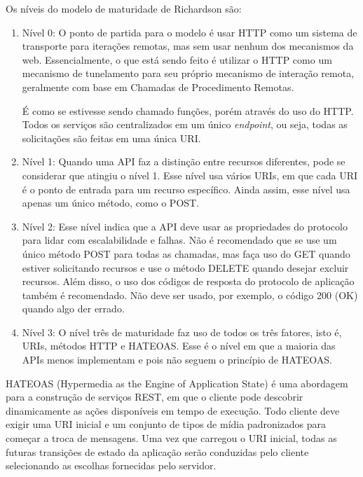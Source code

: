 Os níveis do modelo de maturidade de Richardson são:

\begin{enumerate}[label=\alph*)]

\item Nível 0: O ponto de partida para o modelo é usar HTTP como um sistema de transporte para iterações remotas, mas sem usar nenhum dos mecanismos da web. Essencialmente, o que está sendo feito é utilizar o HTTP como um mecanismo de tunelamento para seu próprio mecanismo de interação remota, geralmente com base em Chamadas de Procedimento Remotas. 

É como se estivesse sendo chamado funções, porém através do uso do HTTP. Todos os serviços são centralizados em um único \textit{endpoint}, ou seja, todas as solicitações são feitas em uma única URI.

\item Nível 1: Quando uma API faz a distinção entre recursos diferentes, pode se considerar que atingiu o nível 1. Esse nível usa vários URIs, em que cada URI é o ponto de entrada para um recurso específico. Ainda assim, esse nível usa apenas um único método, como o POST.

\item Nível 2: Esse nível indica que a API deve usar as propriedades do protocolo para lidar com escalabilidade e falhas. Não é recomendado que se use um único método POST para todas as chamadas, mas faça uso do GET quando estiver solicitando recursos e use o método DELETE quando desejar excluir recursos. Além disso, o uso dos códigos de resposta do protocolo de aplicação também é recomendado. Não deve ser usado, por exemplo, o código 200 (OK) quando algo der errado.

\item Nível 3: O nível três de maturidade faz uso de todos os três fatores, isto é, URIs, métodos HTTP e HATEOAS. Esse é o nível em que a maioria das APIs menos implementam e pois não seguem o princípio de HATEOAS.

\end{enumerate}

HATEOAS (Hypermedia as the Engine of Application State) é uma abordagem para a construção de serviços REST, em que o cliente pode descobrir dinamicamente as ações disponíveis em tempo de execução. Todo cliente deve exigir uma URI inicial e um conjunto de tipos de mídia padronizados para começar a troca de mensagens. Uma vez que carregou o URI inicial, todas as futuras transições de estado da aplicação serão conduzidas pelo cliente selecionando as escolhas fornecidas pelo servidor.

